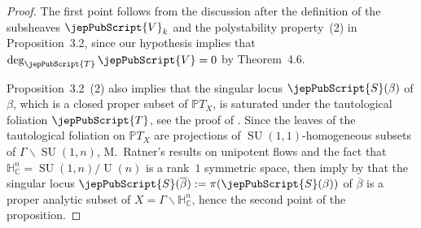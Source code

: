 \begin{proof}
The first point follows from the discussion after the definition of the subsheaves $\jepPubScript{V}_k$ and the polystability property~(2) in Proposition~3.2, since our hypothesis implies that $\deg_{\jepPubScript{T}}\jepPubScript{V}=0$ by Theorem~4.6.

Proposition~3.2~(2) also implies that the singular locus $\jepPubScript{S}(\beta)$ of $\beta$, which is a closed proper subset of $\mathbb PT_X$, is saturated under the tautological foliation $\jepPubScript{T}$, see the proof of \cite[Lem.~4.5]{jep93KM17}. Since the leaves of the tautological foliation on $\mathbb PT_X$ are projections of $\operatorname{SU}(1,1)$-homogeneous subsets of $\Gamma\backslash\operatorname{SU}(1,n)$, M.~Ratner's results on unipotent flows and the fact that $\mathbb H^n_{\mathbb C}=\operatorname{SU}(1,n)/\operatorname U(n)$ is a rank~$1$ symmetric space, then imply by \cite[Prop.~3.6]{jep93KM17} that the singular locus $\jepPubScript{S}(\overline\beta):=\pi(\jepPubScript{S}(\beta))$ of $\overline\beta$ is a proper analytic subset of $X=\Gamma\backslash\mathbb H^n_{\mathbb C}$, hence the second point of the proposition.
\end{proof}

